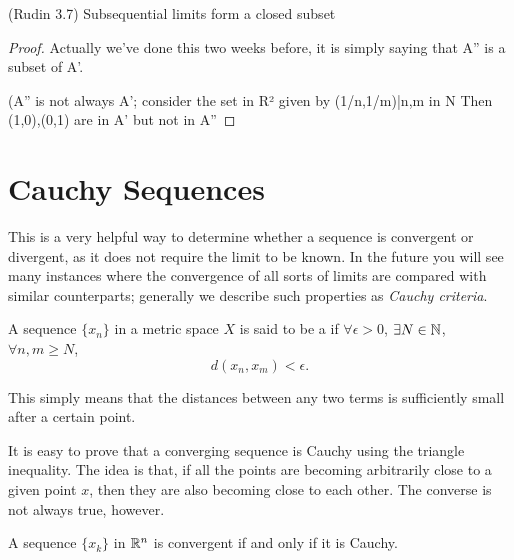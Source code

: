 \begin{proposition}
(Rudin 3.7) Subsequential limits form a closed subset
\end{proposition}

\begin{proof}
Actually we've done this two weeks before, it is simply saying that A'' is a subset of A'.

(A'' is not always A'; consider the set in R² given by
{(1/n,1/m)|n,m in N}
Then (1,0),(0,1) are in A' but not in A''
\end{proof}
\pagebreak

\section{Cauchy Sequences}
This is a very helpful way to determine whether a sequence is convergent or divergent, as it does not require the limit to be known. In the future you will see many instances where the convergence of all sorts of limits are compared with similar counterparts; generally we describe such properties as \emph{Cauchy criteria}.

\begin{definition}
A sequence $\{x_n\}$ in a metric space $X$ is said to be a  if $\forall\epsilon>0$, $\exists N\in\mathbb N$, $\forall n,m\ge N$,
\[ d(x_n,x_m)<\epsilon. \] 
\end{definition}

\begin{remark}
This simply means that the distances between any two terms is sufficiently small after a certain point.
\end{remark}

It is easy to prove that a converging sequence is Cauchy using the triangle inequality. The idea is that, if all the points are becoming arbitrarily close to a given point $x$, then they are also becoming close to each other. The converse is not always true, however.

\begin{proposition}
A sequence $\{x_k\}$ in $\mathbb R^n$ is convergent if and only if it is Cauchy.
\end{proposition}

